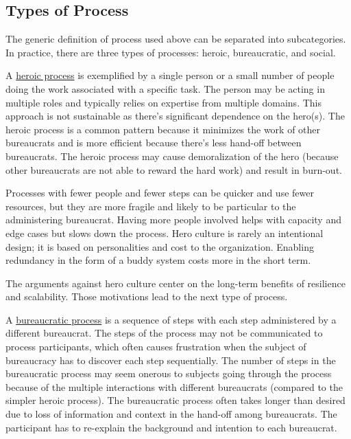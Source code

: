 
\subsection*{Types of Process}
The generic definition of \gls{process} used above can be separated into subcategories. In practice, there are three types of processes: heroic, bureaucratic, and social.

A \underline{heroic process} is exemplified by a single person or a small number of people doing the work associated with a specific task. The person may be acting in multiple roles and typically relies on expertise from multiple domains. This approach is not sustainable as there's significant dependence on the hero(s). The heroic process is a common pattern because it minimizes the work of other bureaucrats and is more efficient because there's less hand-off between bureaucrats. The heroic process may cause demoralization of the hero (because other bureaucrats are not able to reward the hard work) and result in burn-out. 

Processes with fewer people and fewer steps can be quicker and use fewer resources, but they are more fragile and likely to be particular to the administering bureaucrat. Having more people involved helps with capacity and edge cases but slows down the process.  Hero culture is rarely an intentional design; it is based on personalities and cost to the organization. Enabling redundancy in the form of a buddy system 
costs more in the short term. 

The arguments against hero culture center on the long-term benefits of resilience and scalability. Those motivations lead to the next type of process.

A \underline{bureaucratic process} is a sequence of steps with each step administered by a different bureaucrat. The steps of the process may not be communicated to process participants, which often causes frustration when the subject of bureaucracy has to discover each step sequentially. The number of steps in the bureaucratic process may seem onerous to subjects going through the process because of the multiple interactions with different bureaucrats (compared to the simpler heroic process). The bureaucratic process often takes longer than desired due to loss of information and context in the hand-off among bureaucrats. The participant has to re-explain the background and intention to each bureaucrat.

